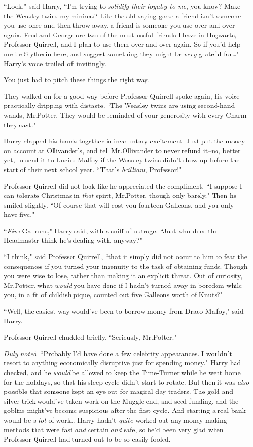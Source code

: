 ``Look," said Harry, ``I'm trying to \emph{solidify their loyalty to me}, you know? Make the Weasley twins my minions? Like the old saying goes: a friend isn't someone you use once and then throw away, a friend is someone you use over and over again. Fred and George are two of the most useful friends I have in Hogwarts, Professor Quirrell, and I plan to use them over and over again. So if you'd help me be Slytherin here, and suggest something they might be \emph{very} grateful for{\ldots}" Harry's voice trailed off invitingly.

You just had to pitch these things the right way.

They walked on for a good way before Professor Quirrell spoke again, his voice practically dripping with distaste. ``The Weasley twins are using second-hand wands, Mr.\?Potter. They would be reminded of your generosity with every Charm they cast."

Harry clapped his hands together in involuntary excitement. Just put the money on account at Ollivander's, and tell Mr.\?Ollivander to never refund it\---no, better yet, to send it to Lucius Malfoy if the Weasley twins didn't show up before the start of their next school year. ``That's \emph{brilliant}, Professor!"

Professor Quirrell did not look like he appreciated the compliment. ``I suppose I can tolerate Christmas in \emph{that} spirit, Mr.\?Potter, though only barely." Then he smiled slightly. ``Of course that will cost you fourteen Galleons, and you only have five."

``\emph{Five} Galleons," Harry said, with a sniff of outrage. ``Just who does the Headmaster think he's dealing with, anyway?"

``I think," said Professor Quirrell, ``that it simply did not occur to him to fear the consequences if you turned your ingenuity to the task of obtaining funds. Though you were wise to lose, rather than making it an explicit threat. Out of curiosity, Mr.\?Potter, what \emph{would} you have done if I hadn't turned away in boredom while you, in a fit of childish pique, counted out five Galleons worth of Knuts?"

``Well, the easiest way would've been to borrow money from Draco Malfoy," said Harry.

Professor Quirrell chuckled briefly. ``Seriously, Mr.\?Potter."

\emph{Duly noted.} ``Probably I'd have done a few celebrity appearances. I wouldn't resort to anything economically disruptive just for spending money." Harry had checked, and he \emph{would} be allowed to keep the Time-Turner while he went home for the holidays, so that his sleep cycle didn't start to rotate. But then it was \emph{also} possible that someone kept an eye out for magical day traders. The gold and silver trick would've taken work on the Muggle end, and seed funding, and the goblins might've become suspicious after the first cycle. And starting a real bank would be a \emph{lot} of work{\ldots} Harry hadn't \emph{quite} worked out any money-making methods that were fast \emph{and} certain \emph{and} safe, so he'd been very glad when Professor Quirrell had turned out to be so easily fooled.

